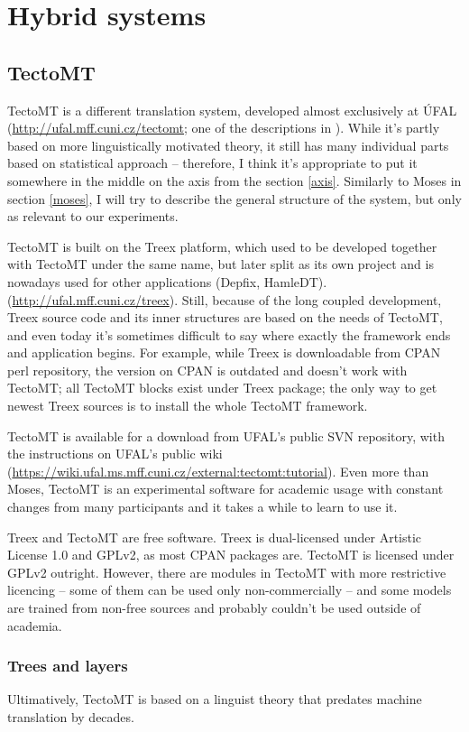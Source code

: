\section{Hybrid systems}
\subsection{TectoMT}
\label{tecto}
TectoMT is a different translation system, developed almost exclusively at ÚFAL (\url{http://ufal.mff.cuni.cz/tectomt}; one of the descriptions in \cite{tmt_desc}). While it's partly based on more linguistically motivated theory, it still has many individual parts based on statistical approach -- therefore, I think it's appropriate to put it somewhere in the middle on the axis from the section \ref{axis}. Similarly to Moses in section \ref{moses}, I will try to describe the general structure of the system, but only as relevant to our experiments.

TectoMT is built on the Treex platform, which used to be developed together with TectoMT under the same name, but later split as its own project and is nowadays used for other applications (Depfix, HamleDT). (\url{http://ufal.mff.cuni.cz/treex}). 
Still, because of the long coupled development, Treex source code and its inner structures are based on the needs of TectoMT, and even today it's sometimes difficult to say where exactly the framework ends and application begins. For example, while Treex is downloadable from CPAN perl repository, the version on CPAN is outdated and doesn't work with TectoMT; all TectoMT blocks exist under Treex package; the only way to get newest Treex sources is to install the whole TectoMT framework.

TectoMT is available for a download from UFAL's public SVN repository, with the instructions on UFAL's public wiki (\url{https://wiki.ufal.ms.mff.cuni.cz/external:tectomt:tutorial}). Even more than Moses, TectoMT is an experimental software for academic usage with constant changes from many participants and it takes a while to learn to use it.

Treex and TectoMT are free software. Treex is dual-licensed under Artistic License 1.0 and GPLv2, as most CPAN packages are. TectoMT is licensed under GPLv2 outright. However, there are modules in TectoMT with more restrictive licencing -- some of them can be used only non-commercially -- and some models are trained from non-free sources and probably couldn't be used outside of academia. 


\subsubsection{Trees and layers}
Ultimatively, TectoMT is based on a linguist theory that predates machine translation by decades.

